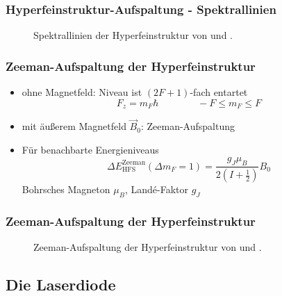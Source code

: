  


\begin{frame}
\frametitle{Hyperfeinstruktur-Aufspaltung - Spektrallinien}

\begin{figure}
    \centering
    \def\svgwidth{\textwidth}
    
    \caption{Spektrallinien der Hyperfeinstruktur von  und .}
\end{figure}

\end{frame}

\begin{frame}
\frametitle{Zeeman-Aufspaltung der Hyperfeinstruktur}
\begin{itemize}
    \item<1-> ohne Magnetfeld: Niveau ist $(2F+1)$-fach entartet
    \begin{equation*}
        F_z = m_F \hbar \qquad \qquad -F \leq m_F \leq F
    \end{equation*}
    \item<2-> mit äußerem Magnetfeld $\vec{B}_0$: Zeeman-Aufspaltung
    \item<3-> Für benachbarte Energieniveaus
    \begin{equation*}
        \Delta E_\text{HFS}^\text{Zeeman}(\Delta m_F = 1) = \frac{g_J \mu_B}{2 \left( I + \frac{1}{2} \right) } B_0
    \end{equation*}
    Bohrsches Magneton $\mu_B$, Landé-Faktor $g_J$
\end{itemize}
\end{frame}

\begin{frame}
\frametitle{Zeeman-Aufspaltung der Hyperfeinstruktur}


\begin{figure}
    \centering
    \def\svgwidth{\textwidth}
    
    \caption{Zeeman-Aufspaltung der Hyperfeinstruktur von  und .}
\end{figure}

\end{frame}





\subsection{Die Laserdiode}

